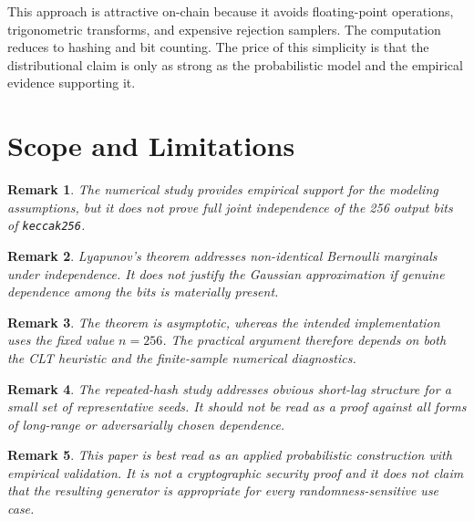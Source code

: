 \documentclass[11pt]{article}
\newtheorem{remark}{Remark}
\begin{document}
This approach is attractive on-chain because it avoids floating-point
operations, trigonometric transforms, and expensive rejection samplers. The
computation reduces to hashing and bit counting. The price of this simplicity is
that the distributional claim is only as strong as the probabilistic model and
the empirical evidence supporting it.

\begin{table}[htbp]
\centering
\small

\caption{Summary diagnostics across the six one-shot experiments.}
\label{tab:summary}
\end{table}

\section{Scope and Limitations}

\begin{remark}
The numerical study provides empirical support for the modeling assumptions, but
it does not prove full joint independence of the 256 output bits of
\texttt{keccak256}.
\end{remark}

\begin{remark}
Lyapunov's theorem addresses non-identical Bernoulli marginals under
independence. It does not justify the Gaussian approximation if genuine
dependence among the bits is materially present.
\end{remark}

\begin{remark}
The theorem is asymptotic, whereas the intended implementation uses the fixed
value $n=256$. The practical argument therefore depends on both the CLT
heuristic and the finite-sample numerical diagnostics.
\end{remark}

\begin{remark}
The repeated-hash study addresses obvious short-lag structure for a small set of
representative seeds. It should not be read as a proof against all forms of
long-range or adversarially chosen dependence.
\end{remark}

\begin{remark}
This paper is best read as an applied probabilistic construction with empirical
validation. It is not a cryptographic security proof and it does not claim that
the resulting generator is appropriate for every randomness-sensitive use case.
\end{remark}
\end{document}
